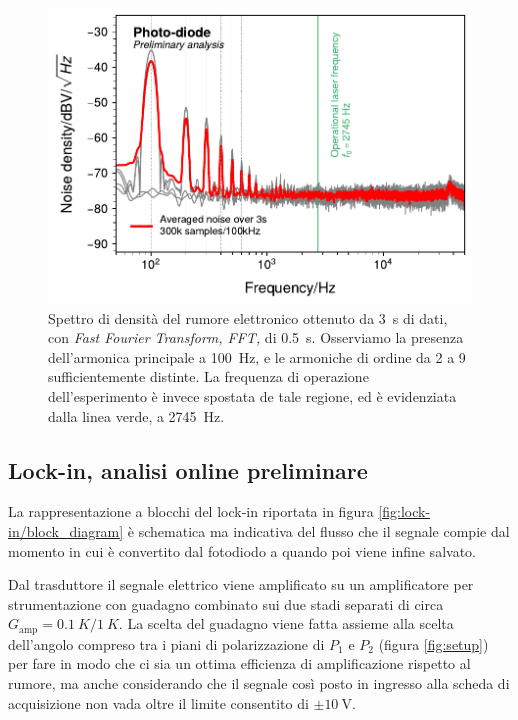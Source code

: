 \documentclass[prb,showpacs,floatfix,altaffilletter,amsmath,amssymb,reprint,citeautoscript,showkeys]{revtex4-1}
\begin{document}
\begin{figure}
    \centering
    \includegraphics[width=\linewidth]{figures/noise_nds.pdf}
    \caption{Spettro di densità\cite{welchUseFastFourier1967a} del rumore elettronico ottenuto da \SI{3}{\second} di dati, con \emph{Fast Fourier Transform, FFT,} di \SI{0.5}{\second}. Osserviamo la presenza dell'armonica principale a \SI{100}{\hertz}, e le armoniche di ordine da 2 a 9 sufficientemente distinte. La frequenza di operazione dell'esperimento è invece spostata de tale regione, ed è evidenziata dalla linea verde, a \SI{2745}{\hertz}.}
    \label{fig:NDS}
\end{figure}

\subsection{Lock-in, analisi online preliminare}

La rappresentazione a blocchi del lock-in\cite{scofieldFrequencydomainDescriptionLockin1994} riportata in figura \ref{fig:lock-in/block_diagram} è schematica ma indicativa del flusso che il segnale compie dal momento in cui è convertito dal fotodiodo a quando poi viene infine salvato. 

Dal trasduttore il segnale elettrico viene amplificato su un amplificatore per strumentazione con guadagno combinato sui due stadi separati di circa $G_\mathrm{amp}=\SI{0.1}{K}/\SI{1}{K}$. La scelta del guadagno viene fatta assieme alla scelta dell'angolo compreso tra i piani di polarizzazione di $P_1$ e $P_2$ (figura \ref{fig:setup}) per fare in modo che ci sia un ottima efficienza di amplificazione rispetto al rumore, ma anche considerando che il segnale così posto in ingresso alla scheda di acquisizione non vada oltre il limite consentito di $\pm\SI{10}{\volt}$. 
\end{document}
